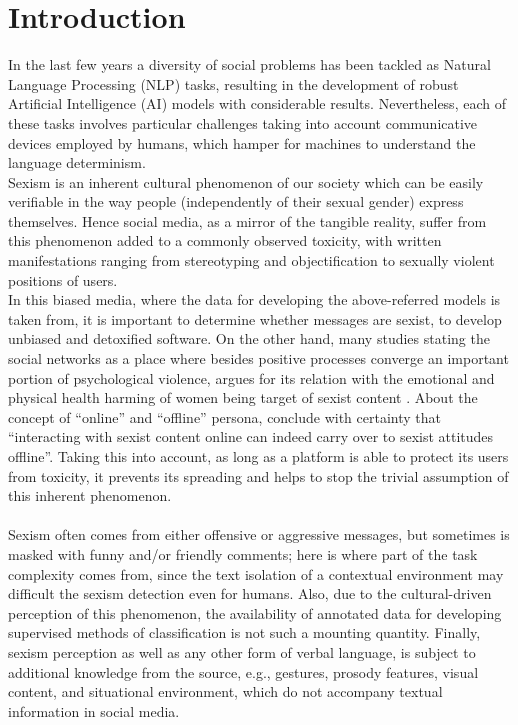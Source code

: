 \documentclass[
]{ceurart}
\begin{document}
\maketitle

\section{Introduction}

In the last few years a diversity of social problems has been tackled as Natural Language Processing (NLP) tasks, resulting in the development of robust Artificial Intelligence (AI) models with considerable results. Nevertheless, each of these tasks involves particular challenges taking into account communicative devices employed by humans, which hamper for machines to understand the language determinism.
\\
Sexism is an inherent cultural phenomenon of our society which can be easily verifiable in the way people (independently of their sexual gender) express themselves. Hence social media, as a mirror of the tangible reality, suffer from this phenomenon added to a commonly observed toxicity, with written manifestations ranging from stereotyping and objectification to sexually violent positions of users. 
\\
In this biased media, where the data for developing the above-referred models is taken from, it is important to determine whether messages are sexist, to develop unbiased and detoxified software. On the other hand, many studies stating the social networks as a place where besides positive processes converge an important portion of psychological violence, argues for its relation with the emotional and physical health harming of women being target of sexist content \cite{berg2001everyday}. About the concept of ``online'' and ``offline'' persona, \cite{10.1016/j.chb.2015.06.024} conclude with certainty that ``interacting with sexist content online can indeed carry over to sexist attitudes offline''. Taking this into account, as long as a platform is able to protect its users from toxicity, it prevents its spreading and helps to stop the trivial assumption of this inherent phenomenon.\\\\	
Sexism often comes from either offensive or aggressive messages, but sometimes is masked with funny and/or friendly comments; here is where part of the task complexity comes from, since the text isolation of a contextual environment may difficult the sexism detection even for humans. Also, due to the cultural-driven perception of this phenomenon, the availability of annotated data for developing supervised methods of classification is not such a mounting quantity. Finally, sexism perception as well as any other form of verbal language, is subject to additional knowledge from the source, e.g.,  gestures, prosody features, visual content, and situational environment, which do not accompany textual information in social media.
\end{document}
